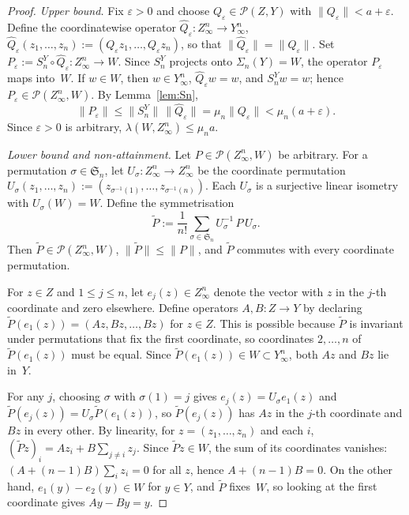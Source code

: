 \documentclass[11pt]{amsart}
\renewcommand{\le}{\leqslant}
\theoremstyle{definition}
\theoremstyle{remark}
\theoremstyle{plain}
\numberwithin{equation}{section}
\begin{document}
\begin{proof}
\emph{Upper bound.}
Fix $\varepsilon>0$ and choose $Q_\varepsilon\in\mathcal P(Z,Y)$ with
$\|Q_\varepsilon\|<a+\varepsilon$.  Define the coordinatewise operator
$\widehat Q_\varepsilon\colon Z_\infty^n\to Y_\infty^n$,
$\widehat Q_\varepsilon(z_1,\dots,z_n):=
(Q_\varepsilon z_1,\dots,Q_\varepsilon z_n)$,
so that $\|\widehat Q_\varepsilon\|=\|Q_\varepsilon\|$.  Set
$P_\varepsilon:=S_n^Y\circ\widehat Q_\varepsilon\colon Z_\infty^n\to W$.
Since $S_n^Y$ projects onto $\Sigma_n(Y)=W$, the operator
$P_\varepsilon$ maps into~$W$.  If $w\in W$, then $w\in Y_\infty^n$,
$\widehat Q_\varepsilon w=w$, and $S_n^Yw=w$; hence
$P_\varepsilon\in\mathcal P(Z_\infty^n,W)$.  By Lemma~\ref{lem:Sn},
\[
\|P_\varepsilon\|
\le \|S_n^Y\|\,\|\widehat Q_\varepsilon\|
=\mu_n\|Q_\varepsilon\|
<\mu_n(a+\varepsilon).
\]
Since $\varepsilon>0$ is arbitrary, $\lambda(W,Z_\infty^n)\le\mu_n a$.

\smallskip
\emph{Lower bound and non-attainment.}
Let $P\in\mathcal P(Z_\infty^n,W)$ be arbitrary.  For a permutation
$\sigma\in\mathfrak S_n$, let
$U_\sigma\colon Z_\infty^n\to Z_\infty^n$ be the coordinate permutation
$U_\sigma(z_1,\dots,z_n):=(z_{\sigma^{-1}(1)},\dots,z_{\sigma^{-1}(n)})$.
Each $U_\sigma$ is a surjective linear isometry with $U_\sigma(W)=W$.
Define the symmetrisation
\[
\widetilde P:=\frac{1}{n!}\sum_{\sigma\in\mathfrak S_n}
U_\sigma^{-1}\,P\,U_\sigma.
\]
Then $\widetilde P\in\mathcal P(Z_\infty^n,W)$,
$\|\widetilde P\|\le\|P\|$, and $\widetilde P$ commutes with every
coordinate permutation.

For $z\in Z$ and $1\le j\le n$, let $e_j(z)\in Z_\infty^n$ denote the
vector with $z$ in the $j$-th coordinate and zero elsewhere.  Define
operators $A,B\colon Z\to Y$ by declaring
$\widetilde P(e_1(z))=(Az,Bz,\dots,Bz)$ for $z\in Z$.
This is possible because $\widetilde P$ is invariant under permutations
that fix the first coordinate, so coordinates $2,\dots,n$ of
$\widetilde P(e_1(z))$ must be equal.  Since
$\widetilde P(e_1(z))\in W\subset Y_\infty^n$, both $Az$ and $Bz$
lie in~$Y$.

For any $j$, choosing $\sigma$ with $\sigma(1)=j$ gives
$e_j(z)=U_\sigma e_1(z)$ and
$\widetilde P(e_j(z))=U_\sigma\widetilde P(e_1(z))$, so
$\widetilde P(e_j(z))$ has $Az$ in the $j$-th coordinate and $Bz$ in
every other.  By linearity, for $z=(z_1,\dots,z_n)$ and each $i$,
$(\widetilde Pz)_i=Az_i+B\sum_{j\ne i}z_j$.
Since $\widetilde Pz\in W$, the sum of its coordinates vanishes:
$(A+(n-1)B)\sum_i z_i=0$ for all $z$, hence $A+(n-1)B=0$.  On the
other hand, $e_1(y)-e_2(y)\in W$ for $y\in Y$, and $\widetilde P$
fixes~$W$, so looking at the first coordinate gives $Ay-By=y$.


\end{proof}
\end{document}
